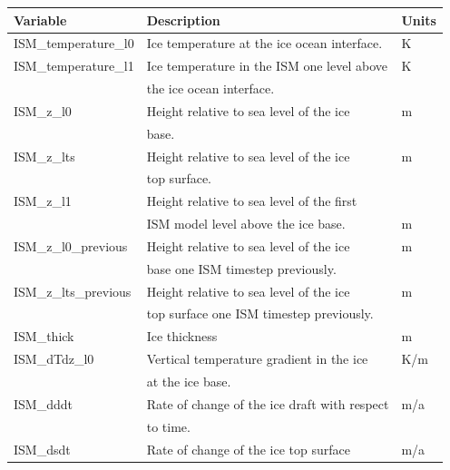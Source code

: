\documentclass[12pt]{article}
\begin{document}
\begin{table}
  \begin{center}
    \begin{tabular}{ l|l|l }
      Variable              & Description                                  & Units \\
      \hline
      ISM\_temperature\_l0  & Ice temperature at the ice ocean interface.  & K \\
      ISM\_temperature\_l1  & Ice temperature in the ISM one level above   & K \\
                            & the ice ocean interface.                     &   \\ 
      ISM\_z\_l0            & Height relative to sea level of the ice      & m \\
                            & base.                                        &   \\
      ISM\_z\_lts           & Height relative to sea level of the ice      & m \\
                            & top surface.                                 &   \\
      ISM\_z\_l1            & Height relative to sea level of the first    &   \\
                            & ISM model level above the ice base.          & m \\
      ISM\_z\_l0\_previous  & Height relative to sea level of the ice      & m \\
                            & base one ISM timestep previously.            &   \\
      ISM\_z\_lts\_previous & Height relative to sea level of the ice      & m \\
                            & top surface one ISM timestep previously.     &   \\
      ISM\_thick            & Ice thickness                                & m \\
      ISM\_dTdz\_l0         & Vertical temperature gradient in the ice     & K/m \\
                            & at the ice base.                             &   \\
      ISM\_dddt             & Rate of change of the ice draft with respect & m/a \\
                            & to time.                                     &   \\
      ISM\_dsdt             & Rate of change of the ice top surface        & m/a \\

\end{tabular}
\end{center}
\end{table}
\end{document}
